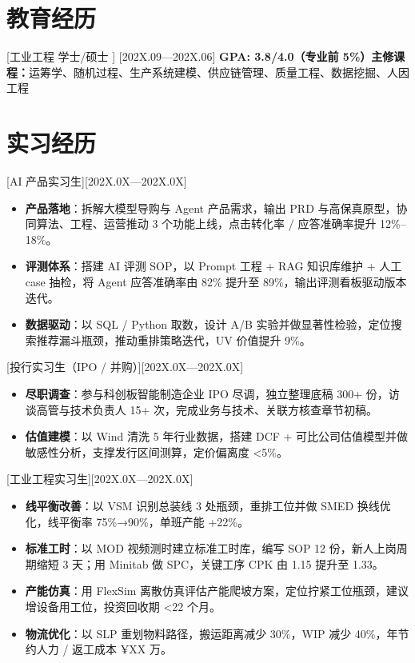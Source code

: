 \documentclass{resume}
\begin{document}
\section{教育经历}
      [工业工程       \indent 学士/硕士       ]           [202X.09—202X.06]
\textbf{GPA: 3.8/4.0（专业前 5\%）\indent 主修课程：}运筹学、随机过程、生产系统建模、供应链管理、质量工程、数据挖掘、人因工程


\section{实习经历}

[AI 产品实习生][202X.0X—202X.0X]

\begin{itemize}
    \item \textbf{产品落地}：拆解大模型导购与 Agent 产品需求，输出 PRD 与高保真原型，协同算法、工程、运营推动 3 个功能上线，点击转化率 / 应答准确率提升 12\%–18\%。
    \item \textbf{评测体系}：搭建 AI 评测 SOP，以 Prompt 工程 + RAG 知识库维护 + 人工 case 抽检，将 Agent 应答准确率由 82\% 提升至 89\%，输出评测看板驱动版本迭代。
    \item \textbf{数据驱动}：以 SQL / Python 取数，设计 A/B 实验并做显著性检验，定位搜索推荐漏斗瓶颈，推动重排策略迭代，UV 价值提升 9\%。
   \end{itemize}

[投行实习生（IPO / 并购）][202X.0X—202X.0X]

\begin{itemize}
    \item \textbf{尽职调查}：参与科创板智能制造企业 IPO 尽调，独立整理底稿 300+ 份，访谈高管与技术负责人 15+ 次，完成业务与技术、关联方核查章节初稿。
    \item \textbf{估值建模}：以 Wind 清洗 5 年行业数据，搭建 DCF + 可比公司估值模型并做敏感性分析，支撑发行区间测算，定价偏离度 <5\%。
  \end{itemize}

[工业工程实习生][202X.0X—202X.0X]

\begin{itemize}
    \item \textbf{线平衡改善}：以 VSM 识别总装线 3 处瓶颈，重排工位并做 SMED 换线优化，线平衡率 75\%→90\%，单班产能 +22\%。
    \item \textbf{标准工时}：以 MOD 视频测时建立标准工时库，编写 SOP 12 份，新人上岗周期缩短 3 天；用 Minitab 做 SPC，关键工序 CPK 由 1.15 提升至 1.33。
    \item \textbf{产能仿真}：用 FlexSim 离散仿真评估产能爬坡方案，定位拧紧工位瓶颈，建议增设备用工位，投资回收期 <22 个月。
    \item \textbf{物流优化}：以 SLP 重划物料路径，搬运距离减少 30\%，WIP 减少 40\%，年节约人力 / 返工成本 ¥XX 万。
\end{itemize}
\end{document}
